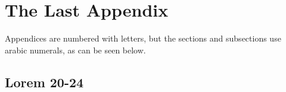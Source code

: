 \chapter{The Last Appendix}
\label{app:n}
Appendices are numbered with letters, but the sections and subsections use
arabic numerals, as can be seen below.

\section{Lorem 20-24}


